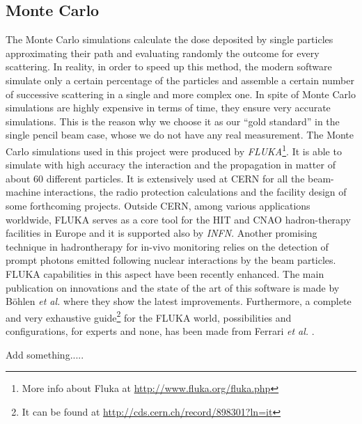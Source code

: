 \documentclass[12pt, a4paper, twoside]{book}
\begin{document}
\subsection{Monte Carlo}
The Monte Carlo simulations calculate the dose deposited by single particles approximating their path and evaluating randomly the outcome for every scattering. In reality, in order to speed up this method, the modern software simulate only a certain percentage of the particles and assemble a certain number of successive scattering in a single and more complex one. In spite of Monte Carlo simulations are highly expensive in terms of time, they ensure very accurate simulations. This is the reason why we choose it as our ``gold standard'' in the single pencil beam case, whose we do not have any real measurement.
The Monte Carlo simulations used in this project were produced by \emph{FLUKA}\footnote{More info about Fluka at \url{http://www.fluka.org/fluka.php}}. It is able to simulate with high accuracy the interaction and the propagation in matter of about 60 different particles. It is extensively used at CERN for all the beam-machine interactions, the radio protection calculations and the facility design of some forthcoming projects. 
Outside CERN, among various applications worldwide, FLUKA serves as a core tool for the HIT and CNAO hadron-therapy facilities in Europe and it is supported also by \emph{INFN}.
Another promising technique in hadrontherapy for in-vivo monitoring relies on the detection of prompt photons emitted following nuclear interactions by the beam particles. FLUKA capabilities in this aspect have been recently enhanced.
The main publication on innovations and the state of the art of this software is made by B\"ohlen \emph{et al.} \cite{boeh:fluka} where they show the latest improvements.
Furthermore, a complete and very exhaustive guide\footnote{It can be found at \url{http://cds.cern.ch/record/898301?ln=it}} for the FLUKA world, possibilities and configurations, for experts and none, has been made from Ferrari \emph{et al.} \cite{ferr:fluka}.

Add something..... %
\end{document}
